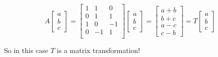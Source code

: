 \documentclass[pdf
,handout
]{beamer}
\begin{document}
{{\begin{example}[Revisited]
\[
A\left[\begin{array}{r} a \\ b\\ c \end{array}\right]
=
\left[ \begin{array}{rrr}
1 & 1 & 0 \\
0 & 1 & 1 \\
1 & 0 & -1 \\
0 & -1 & 1 \\
\end{array}
\right]
\left[\begin{array}{r} a \\ b\\ c \end{array}\right]
=
\left[ \begin{array}{c} 
a+b \\ b+c \\ a-c\\ c-b \end{array}\right]
=
T\left[\begin{array}{c} a \\ b\\ c\end{array}\right]
\]

\pause 

\alert{So in this case $T$ is a matrix transformation!}
\end{example}
}}



\end{document}
